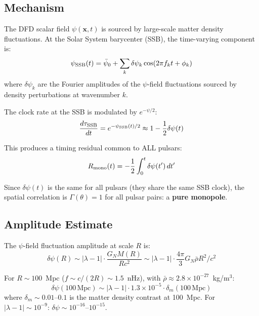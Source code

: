 \documentclass[11pt,a4paper]{article}
\newcounter{findingctr}
\newenvironment{finding}[1][]{%
  \refstepcounter{findingctr}%
  \begin{tcolorbox}[colback=blue!3!white, colframe=blue!50!black,
    title=\textbf{Finding \thefindingctr: #1}]
}{%
  \end{tcolorbox}%
}
\newcommand{\ee}[1]{\times 10^{#1}}
\begin{document}
\begin{finding}[\textbf{PTA MONOPOLE}: DFD Predicts Monopolar Timing
  Residuals at $\sim$1--10~ns, Consistent with NANOGrav 15yr]
\label{find:PTA}

\subsection*{Mechanism}

The DFD scalar field $\psi(\mathbf{x}, t)$ is sourced by large-scale
matter density fluctuations. At the Solar System barycenter (SSB),
the time-varying component is:
\begin{equation}
\psi_{\rm SSB}(t) = \bar{\psi}_0 + \sum_k \delta\psi_k \cos(2\pi f_k t + \phi_k)
\end{equation}
where $\delta\psi_k$ are the Fourier amplitudes of the $\psi$-field
fluctuations sourced by density perturbations at wavenumber $k$.

The clock rate at the SSB is modulated by $e^{-\psi/2}$:
\begin{equation}
\frac{d\tau_{\rm SSB}}{dt} = e^{-\psi_{\rm SSB}(t)/2}
\approx 1 - \frac{1}{2}\delta\psi(t)
\end{equation}

This produces a timing residual common to ALL pulsars:
\begin{equation}
R_{\rm mono}(t) = -\frac{1}{2}\int_0^t \delta\psi(t')\,dt'
\end{equation}

Since $\delta\psi(t)$ is the same for all pulsars (they share the
same SSB clock), the spatial correlation is $\Gamma(\theta) = 1$
for all pulsar pairs: a \textbf{pure monopole}.

\subsection*{Amplitude Estimate}

The $\psi$-field fluctuation amplitude at scale $R$ is:
\begin{equation}
\delta\psi(R) \sim |\lambda - 1| \cdot \frac{G_N M(R)}{R c^2}
\sim |\lambda - 1| \cdot \frac{4\pi}{3} G_N \bar{\rho} R^2 / c^2
\end{equation}

For $R \sim 100$~Mpc ($f \sim c/(2R) \sim 1.5$~nHz), with
$\bar{\rho} \approx 2.8 \ee{-27}$~kg/m$^3$:
\begin{equation}
\delta\psi(100\,\text{Mpc}) \sim |\lambda - 1| \cdot 1.3 \ee{-5}
\cdot \delta_m(100\,\text{Mpc})
\end{equation}
where $\delta_m \sim 0.01$--$0.1$ is the matter density contrast
at 100~Mpc. For $|\lambda - 1| \sim 10^{-9}$:
$\delta\psi \sim 10^{-16}$--$10^{-15}$.


\end{finding}
\end{document}

